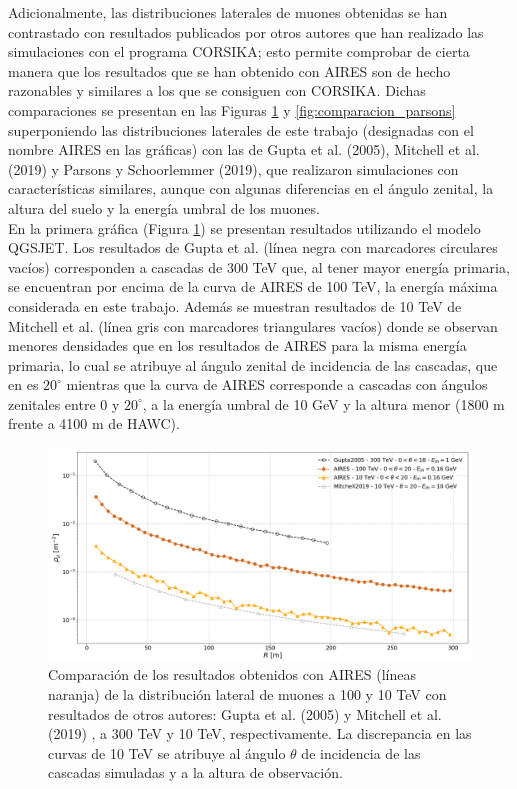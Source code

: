 Adicionalmente, las distribuciones laterales de muones obtenidas se han contrastado con resultados publicados por otros autores que han realizado las simulaciones con el programa CORSIKA; esto permite comprobar de cierta manera que los resultados que se han obtenido con AIRES son de hecho razonables y similares a los que se consiguen con CORSIKA. Dichas comparaciones se presentan en las Figuras \ref{fig:comparacion_otros} y \ref{fig:comparacion_parsons} superponiendo las distribuciones laterales de este trabajo (designadas con el nombre AIRES en las gr\'aficas) con las de Gupta et al. (2005), Mitchell et al. (2019) y Parsons y Schoorlemmer (2019), que realizaron simulaciones con caracter\'isticas similares, aunque con algunas diferencias en el \'angulo zenital, la altura del suelo y la energ\'ia umbral de los muones.\\

En la primera gr\'afica (Figura \ref{fig:comparacion_otros}) se presentan resultados utilizando el modelo QGSJET. Los resultados de Gupta et al. (l\'inea negra con marcadores circulares vac\'ios) corresponden a cascadas de 300 TeV \cite{Gupta2005} que, al tener mayor energ\'ia primaria, se encuentran por encima de la curva de AIRES de 100 TeV, la energ\'ia m\'axima considerada en este trabajo. Adem\'as se muestran resultados de 10 TeV  de Mitchell et al. \cite{Mitchell2019} (l\'inea gris con marcadores triangulares vac\'ios) donde se observan menores densidades que en los resultados de AIRES para la misma energ\'ia primaria, lo cual se atribuye al \'angulo zenital de incidencia de las cascadas, que en \cite{Mitchell2019} es $20^{\circ}$ mientras que la curva de AIRES corresponde a cascadas con \'angulos zenitales entre 0 y $20^{\circ}$, a la energ\'ia umbral de 10 GeV y la altura menor (1800 m frente a 4100 m de HAWC).\\
	\begin{figure}[] 
	\includegraphics[width=\textwidth]{Figuras/comparacion_otros}
	\caption{Comparaci\'on de los resultados obtenidos con AIRES (l\'ineas naranja) de la distribuci\'on lateral de muones a 100 y 10 TeV con resultados de otros autores: Gupta et al. (2005) \cite{Gupta2005} y Mitchell et al. (2019) \cite{Mitchell2019}, a 300 TeV y 10 TeV, respectivamente. La discrepancia en las curvas de 10 TeV se atribuye al \'angulo $\theta$ de incidencia de las cascadas simuladas y a la altura de observaci\'on.}
	\label{fig:comparacion_otros}
	\end{figure}	
	

